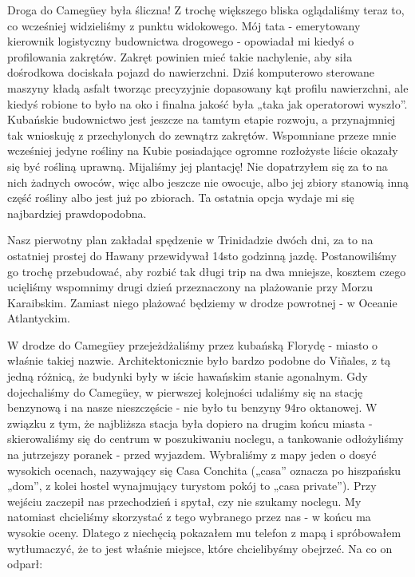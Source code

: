 Droga do Camegüey była śliczna! 
Z trochę większego bliska oglądaliśmy teraz to, co wcześniej widzieliśmy z punktu widokowego.
Mój tata - emerytowany kierownik logistyczny budownictwa drogowego - opowiadał mi kiedyś o profilowania zakrętów. 
Zakręt powinien mieć takie nachylenie, aby siła dośrodkowa dociskała pojazd do nawierzchni. 
Dziś komputerowo sterowane maszyny kładą asfalt tworząc precyzyjnie dopasowany kąt profilu nawierzchni, ale kiedyś robione to było na oko i finalna jakość była „taka jak operatorowi wyszło”. 
Kubańskie budownictwo jest jeszcze na tamtym etapie rozwoju, a przynajmniej tak wnioskuję z przechylonych do zewnątrz zakrętów. 
Wspomniane przeze mnie wcześniej jedyne rośliny na Kubie posiadające ogromne rozłożyste liście okazały się być rośliną uprawną. 
Mijaliśmy jej plantację!
Nie dopatrzyłem się za to na nich żadnych owoców, więc albo jeszcze nie owocuje, albo jej zbiory stanowią inną część rośliny albo jest już po zbiorach. 
Ta ostatnia opcja wydaje mi się najbardziej prawdopodobna.
\par Nasz pierwotny plan zakładał spędzenie w Trinidadzie dwóch dni, za to na ostatniej prostej do Hawany przewidywał 14sto godzinną jazdę. 
Postanowiliśmy go trochę przebudować, aby rozbić tak długi trip na dwa mniejsze, kosztem czego ucięliśmy wspomnimy drugi dzień przeznaczony na plażowanie przy Morzu Karaibskim. 
Zamiast niego plażować będziemy w drodze powrotnej - w Oceanie Atlantyckim.
\par W drodze do Camegüey przejeżdżaliśmy przez kubańską Florydę - miasto o właśnie takiej nazwie.
Architektonicznie było bardzo podobne do Viñales, z tą jedną różnicą, że budynki były w iście hawańskim stanie agonalnym. 
Gdy dojechaliśmy do Camegüey, w pierwszej kolejności udaliśmy się na stację benzynową i na nasze nieszczęście - nie było tu benzyny 94ro oktanowej. 
W związku z tym, że najbliższa stacja była dopiero na drugim końcu miasta - skierowaliśmy się do centrum w poszukiwaniu noclegu, a tankowanie odłożyliśmy na jutrzejszy poranek - przed wyjazdem. 
Wybraliśmy z mapy jeden o dosyć wysokich ocenach, nazywający się Casa Conchita („casa” oznacza po hiszpańsku „dom”, z kolei hostel wynajmujący turystom pokój to „casa private”). 
Przy wejściu zaczepił nas przechodzień i spytał, czy nie szukamy noclegu. My natomiast chcieliśmy skorzystać z tego wybranego przez nas - w końcu ma wysokie oceny. Dlatego z niechęcią pokazałem mu telefon z mapą i spróbowałem wytłumaczyć, że to jest właśnie miejsce, które chcielibyśmy obejrzeć. Na co on odparł:

